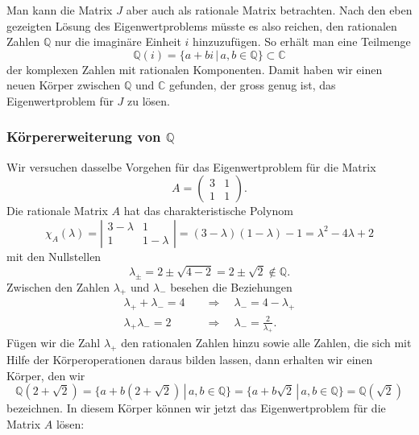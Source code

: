 Man kann die Matrix $J$ aber auch als rationale Matrix betrachten.
Nach den eben gezeigten Lösung des Eigenwertproblems müsste es also
reichen, den rationalen Zahlen $\mathbb Q$ nur die imaginäre Einheit $i$
hinzuzufügen.
So erhält man eine Teilmenge
\[
\mathbb Q(i) = \{a+bi\,|\, a,b\in\mathbb Q\} \subset \mathbb C
\]
der komplexen Zahlen mit rationalen Komponenten.
Damit haben wir einen neuen Körper zwischen $\mathbb Q$ und $\mathbb C$
gefunden, der gross genug ist, das Eigenwertproblem für $J$ zu lösen.

\subsubsection{Körpererweiterung von $\mathbb Q$}
Wir versuchen dasselbe Vorgehen für das Eigenwertproblem für die Matrix
\[
A
=
\begin{pmatrix}
3&1\\
1&1
\end{pmatrix}.
\]
Die rationale Matrix $A$ hat das charakteristische Polynom
\[
\chi_{A}(\lambda)
=
\left|\begin{matrix}3-\lambda&1\\1&1-\lambda\end{matrix}\right|
=
(3-\lambda)(1-\lambda)-1
=
\lambda^2-4\lambda+2
\]
mit den Nullstellen
\[
\lambda_{\pm} = 2\pm\sqrt{4-2}=2\pm\sqrt{2} \not\in \mathbb Q.
\]
Zwischen den Zahlen $\lambda_+$ und $\lambda_-$ besehen die Beziehungen
\begin{align*}
\lambda_+ + \lambda_-=4
\quad&\Rightarrow\quad \lambda_-=4-\lambda_+
\\
\lambda_+\lambda_- = 2
\quad&\Rightarrow\quad \lambda_-=\frac{2}{\lambda_+}.
\end{align*}
Fügen wir die Zahl $\lambda_+$ den rationalen Zahlen hinzu sowie alle
Zahlen, die sich mit Hilfe der Körperoperationen daraus bilden lassen,
dann erhalten wir einen Körper, den wir
\[
\mathbb Q(2+\sqrt{2})
=
\{ a+b(2+\sqrt{2})\,|\, a,b\in\mathbb Q\}
=
\{ a + b\sqrt{2}\,|\,a,b\in\mathbb Q\}
=
\mathbb Q(\!\sqrt{2})
\]
bezeichnen.
In diesem Körper können wir jetzt das Eigenwertproblem für die Matrix $A$
lösen:
